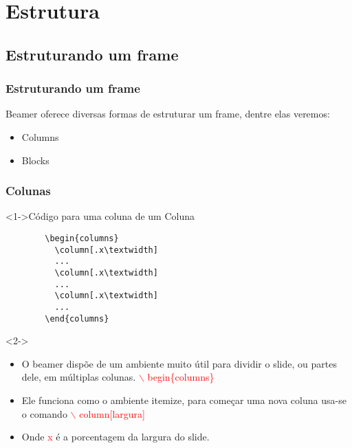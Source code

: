 \section{Estrutura}
\subsection{Estruturando um frame}

\begin{frame}
  \frametitle{Estruturando um frame}

  Beamer oferece diversas formas de estruturar um frame, dentre elas veremos:

  \begin{itemize}
     \item Columns
     \item Blocks
  \end{itemize}

\end{frame}


\begin{frame}[fragile]
  \frametitle{Colunas}

  \begin{block}<1->{Código para uma coluna de um Coluna}
    \begin{verbatim}
        \begin{columns}
          \column[.x\textwidth]
          ...
          \column[.x\textwidth]
          ...
          \column[.x\textwidth]
          ...
        \end{columns}
    \end{verbatim}
  \end{block}

  \begin{block}<2->{}
    \begin{itemize}
       \item O beamer dispõe de um ambiente muito útil para dividir o
            slide, ou partes dele, em múltiplas colunas. \textcolor{red}{ $\backslash$ begin\{columns\}}
       \item Ele funciona como o ambiente itemize, para começar uma nova coluna usa-se o comando
             \textcolor{red} { $\backslash$ column[largura]}
       \item Onde \textcolor{red}{x} é a porcentagem da largura do slide.
    \end{itemize}

  \end{block}

\end{frame}

